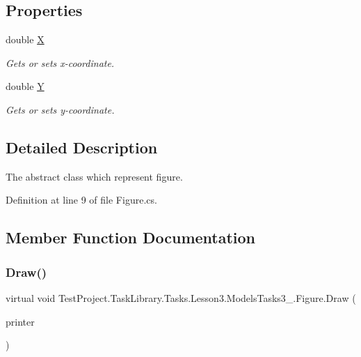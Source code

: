 \subsection*{Properties}
\begin{DoxyCompactItemize}
\item 
double \mbox{\hyperlink{class_test_project_1_1_task_library_1_1_tasks_1_1_lesson3_1_1_models_tasks3__4_1_1_figure_a3d9c1e93520690af9e2231ffd49bf7b8}{X}}
\begin{DoxyCompactList}\small\item\em Gets or sets x-\/coordinate. \end{DoxyCompactList}\item 
double \mbox{\hyperlink{class_test_project_1_1_task_library_1_1_tasks_1_1_lesson3_1_1_models_tasks3__4_1_1_figure_a5e91c21bced0a6ef22dc6319d03be9f3}{Y}}
\begin{DoxyCompactList}\small\item\em Gets or sets y-\/coordinate. \end{DoxyCompactList}\end{DoxyCompactItemize}


\subsection{Detailed Description}
The abstract class which represent figure. 



Definition at line 9 of file Figure.\+cs.



\subsection{Member Function Documentation}
\mbox{\label{class_test_project_1_1_task_library_1_1_tasks_1_1_lesson3_1_1_models_tasks3__4_1_1_figure_a27545f8077537a70f0ac982adb5e95c8}} 
\subsubsection{\texorpdfstring{Draw()}{Draw()}}
{\footnotesize\ttfamily virtual void Test\+Project.\+Task\+Library.\+Tasks.\+Lesson3.\+Models\+Tasks3\+\_.\+Figure.\+Draw (\begin{DoxyParamCaption}\item[{I\+Printer}]{printer }\end{DoxyParamCaption})\hspace{0.3cm}{\ttfamily [virtual]}}



